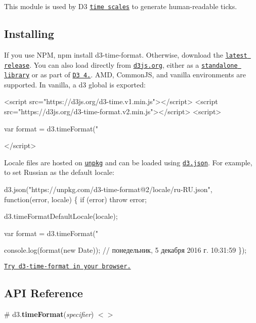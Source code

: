 This module is used by D3 \href{https://github.com/d3/d3-scale/blob/master/README.md#time-scales}{\tt time scales} to generate human-\/readable ticks.

\subsection*{Installing}

If you use N\+PM, {\ttfamily npm install d3-\/time-\/format}. Otherwise, download the \href{https://github.com/d3/d3-time-format/releases/latest}{\tt latest release}. You can also load directly from \href{https://d3js.org}{\tt d3js.\+org}, either as a \href{https://d3js.org/d3-time-format.v2.min.js}{\tt standalone library} or as part of \href{https://github.com/d3/d3}{\tt D3 4.}. A\+MD, Common\+JS, and vanilla environments are supported. In vanilla, a {\ttfamily d3} global is exported\+:


\begin{DoxyCode}
<script src="https://d3js.org/d3-time.v1.min.js"></script>
<script src="https://d3js.org/d3-time-format.v2.min.js"></script>
<script>

var format = d3.timeFormat("%

</script>
\end{DoxyCode}


Locale files are hosted on \href{https://unpkg.com/}{\tt unpkg} and can be loaded using \href{https://github.com/d3/d3-request/blob/master/README.md#json}{\tt d3.\+json}. For example, to set Russian as the default locale\+:


\begin{DoxyCode}
d3.json("https://unpkg.com/d3-time-format@2/locale/ru-RU.json", function(error, locale) \{
  if (error) throw error;

  d3.timeFormatDefaultLocale(locale);

  var format = d3.timeFormat("%

  console.log(format(new Date)); // понедельник,  5 декабря 2016 г. 10:31:59
\});
\end{DoxyCode}


\href{https://tonicdev.com/npm/d3-time-format}{\tt Try d3-\/time-\/format in your browser.}

\subsection*{A\+PI Reference}

\label{_timeFormat}%
\# d3.{\bfseries time\+Format}({\itshape specifier}) \href{https://github.com/d3/d3-time-format/blob/master/src/defaultLocale.js#L4}{\tt $<$$>$}

